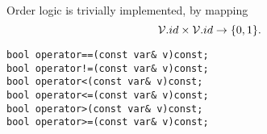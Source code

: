 Order logic is trivially implemented, by mapping
\begin{equation}
\mathcal{V}.id\times\mathcal{V}.id\to\{0,1\}.
\end{equation}
\begin{lstlisting}
bool operator==(const var& v)const;
bool operator!=(const var& v)const;
bool operator<(const var& v)const;
bool operator<=(const var& v)const;
bool operator>(const var& v)const;
bool operator>=(const var& v)const;
\end{lstlisting}

